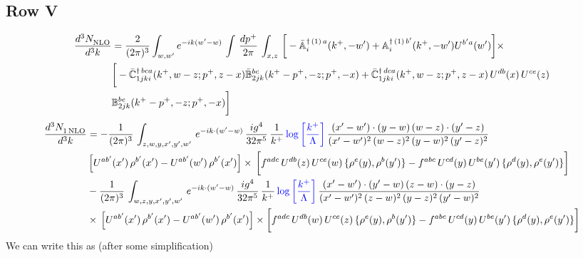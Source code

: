 \documentclass[9pt]{article}
\def\mf#1{\mathbb{#1}}
\numberwithin{equation}{section}
\begin{document}
\subsection{Row V}
\begin{align}
    \frac{d^{3}N_{\rm NLO}^{\rm}}{d^{3}k}  & = \frac{2}{(2\pi)^{3}}  \int_{w, w^\prime} e^{-ik(w^\prime-w)}\, \int\, \frac{dp^{+}}{2\pi}\,\int_{x,z}\, \bigg[-\bar{\mf{A}}^{\dagger\,(1)\,a}_{i}(k^{+},-w^{\prime})+\mf{A}^{\dagger\, (1)\, b^{\prime}}_{i}(k^{+},-w^{\prime})U^{b^{\prime}a}(w^{\prime})\bigg]\times\notag \\ & \bigg[-\Bar{\mf{C}}^{\dagger\, bca}_{1jki}(k^{+},w-z;p^{+},z-x)\Bar{\mf{B}}^{bc}_{2jk}(k^{+}-p^{+},- z;p^{+},-x)+\bar{\mf{C}}^{\dagger\, dca}_{1jki}(k^+,w-z; p^+, z-x)\,U^{db}(x)\,U^{ce}(z) \notag \\ & {\mf{B}}^{be}_{2jk} (k^{+}-p^+, -z; p^+, -x) \bigg]\nonumber
\end{align}
\begin{align}
     \frac{d^{3}N_{1\,\rm NLO}^{\rm}}{d^{3}k}  & =  -\frac{1}{(2\pi)^{3}}\, \int_{z,w,y,x',y',w'}\,e^{-ik\cdot (w^\prime-w)}\,\frac{ig^{4}}{32\pi^{5}}\, \frac{1}{k^{+}}\,{\color{blue}\log{\left[\frac{k^{+}}{\Lambda}\right]}}\,\frac{(x'-w')\cdot (y-w)\,(w-z)\cdot (y'-z)}{(x'-w')^{2}\,(w-z)^{2}\,(y-w)^{2}\,(y'-z)^{2}}\,\notag \\ & \left[U^{ab'}(x')\,\rho^{b'}(x')-U^{ab'}(w')\,\rho^{b'}(x')\right]\times\, \bigg[f^{adc}\,U^{db}(z)\,U^{ce}(w)\, \{\rho^{e}(y),\rho^{b}(y')\}-f^{abc}\,U^{cd}(y)\,U^{be}(y')\, \{\rho^{d}(y),\rho^{e}(y')\}\bigg]\notag \\ &  -\frac{1}{(2\pi)^{3}}\, \int_{w,z,y,x',y',w'}\,e^{-ik\cdot (w^\prime-w)}\,\frac{ig^{4}}{32\pi^{5}}\, \frac{1}{k^{+}}\,{\color{blue}\log{\left[\frac{k^{+}}{\Lambda}\right]}}\,\frac{(x'-w')\cdot (y'-w)\,(z-w)\cdot (y-z)}{(x'-w')^{2}\,(z-w)^{2}\,(y-z)^{2}\,(y'-w)^{2}}\notag \\ & \times\, \left[U^{ab'}(x')\,\rho^{b'}(x')-U^{ab'}(w')\,\rho^{b'}(x')\right]\times \bigg[f^{adc}\,U^{db}(w)\,U^{ce}(z)\, \{\rho^{e}(y),\rho^{b}(y')\}-f^{abc}\,U^{cd}(y)\,U^{be}(y')\, \{\rho^{d}(y),\rho^{e}(y')\}\bigg]
\end{align}
We can write this as (after some simplification)
\end{document}
